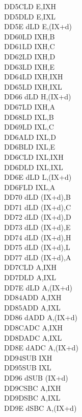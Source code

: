 \begin{multicols}{3}
{\begin{tabbing}
	DD5C\>LD E,IXH\UNDOC\\
	DD5D\>LD E,IXL\UNDOC\\
	DD5E d\>LD E,(IX+d)\\
	DD60\>LD IXH,B\UNDOC\\
	DD61\>LD IXH,C\UNDOC\\
	DD62\>LD IXH,D\UNDOC\\
	DD63\>LD IXH,E\UNDOC\\
	DD64\>LD IXH,IXH\UNDOC\\
	DD65\>LD IXH,IXL\UNDOC\\
	DD66 d\>LD H,(IX+d)\\
	DD67\>LD IXH,A\UNDOC\\
	DD68\>LD IXL,B\UNDOC\\
	DD69\>LD IXL,C\UNDOC\\
	DD6A\>LD IXL,D\UNDOC\\
	DD6B\>LD IXL,E\UNDOC\\
	DD6C\>LD IXL,IXH\UNDOC\\
	DD6D\>LD IXL,IXL\UNDOC\\
	DD6E d\>LD L,(IX+d)\\
	DD6F\>LD IXL,A\UNDOC\\
	DD70 d\>LD (IX+d),B\\
	DD71 d\>LD (IX+d),C\\
	DD72 d\>LD (IX+d),D\\
	DD73 d\>LD (IX+d),E\\
	DD74 d\>LD (IX+d),H\\
	DD75 d\>LD (IX+d),L\\
	DD77 d\>LD (IX+d),A\\
	DD7C\>LD A,IXH\UNDOC\\
	DD7D\>LD A,IXL\UNDOC\\
	DD7E d\>LD A,(IX+d)\\
	DD84\>ADD A,IXH\UNDOC\\
	DD85\>ADD A,IXL\UNDOC\\
	DD86 d\>ADD A,(IX+d)\\
	DD8C\>ADC A,IXH\UNDOC\\
	DD8D\>ADC A,IXL\UNDOC\\
	DD8E d\>ADC A,(IX+d)\\
	DD94\>SUB IXH\UNDOC\\
	DD95\>SUB IXL\UNDOC\\
	DD96 d\>SUB (IX+d)\\
	DD9C\>SBC A,IXH\UNDOC\\
	DD9D\>SBC A,IXL\UNDOC\\
	DD9E d\>SBC A,(IX+d)\\

\end{tabbing}}
\end{multicols}
